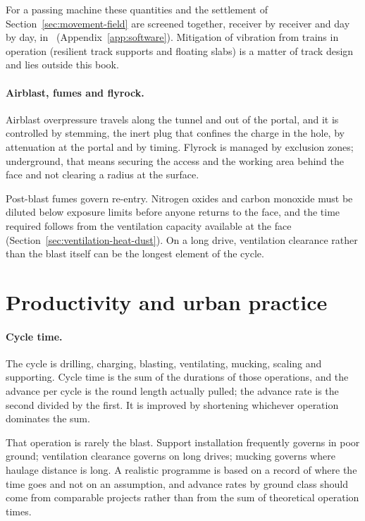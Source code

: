 For a passing machine these quantities and the settlement of
Section~\ref{sec:movement-field} are screened together, receiver by receiver
and day by day, in \companionname\ (Appendix~\ref{app:software}). Mitigation
of vibration from trains in operation (resilient track supports and
floating slabs) is a matter of track design and lies outside this book.

\paragraph{Airblast, fumes and flyrock.}
Airblast overpressure travels along the tunnel and out of the portal, and it
is controlled by stemming, the inert plug that confines the charge in the
hole, by attenuation at the portal and by timing. Flyrock is managed by
exclusion zones; underground, that means securing the access and the working
area behind the face and not clearing a radius at the surface.

Post-blast fumes govern re-entry. Nitrogen oxides and carbon monoxide must be
diluted below exposure limits before anyone returns to the face, and the time
required follows from the ventilation capacity available at the face
(Section~\ref{sec:ventilation-heat-dust}). On a long drive, ventilation clearance
rather than the blast itself can be the longest element of the cycle.

\section{Productivity and urban practice}
\label{sec:productivity-urban}

\paragraph{Cycle time.}
The cycle is drilling, charging, blasting, ventilating, mucking, scaling and
supporting. Cycle time is the sum of the durations of those operations, and
the advance per cycle is the round length actually pulled; the advance rate
is the second divided by the first. It is improved by shortening whichever
operation dominates the sum.

That operation is rarely the blast. Support installation frequently governs in
poor ground; ventilation clearance governs on long drives; mucking governs
where haulage distance is long. A realistic programme is based on a record
of where the time goes and not on an assumption, and advance rates by ground class
should come from comparable projects rather than from the sum of theoretical
operation times.

